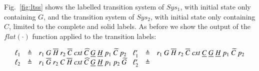 Fig.~\ref{fig:ltss} shows the labelled transition system of $Sys_1$, with initial state only  containing  $G$,  and the transition system of $Sys_2$, with initial state only containing $C$, limited to the complete
and solid labels. As before we show the output of the $\mathit{flat}(\cdot)$ function applied to the transition labels:

{\footnotesize \[
\begin{array}{lcl@{\hspace{0.3cm}} lcl}
\ell_1 &\defeq & 
r_1~G~\overline{H}~r_2~\overline{C}~\mathit{cxt}~\widehat{C}~\underline{G}~\underline{H}~p_1~\widetilde{C}~p_2
&
\ell'_1 &\defeq & 
r_1~G~\overline{H}~r_2~\overline{C}~\mathit{cxt}~\underline{C}~\underline{G}~\underline{H}~p_1~\widetilde{C}~p_2\\
\ell_2 &\defeq &
r_1~\overline{G}~r_2~C~\overline{H}~\mathit{cxt}~\widehat{C}~\underline{G}~\underline{H}~p_1~p_2~\widetilde{G}
&
\ell'_2 &\defeq & 

\end{array}\]}

